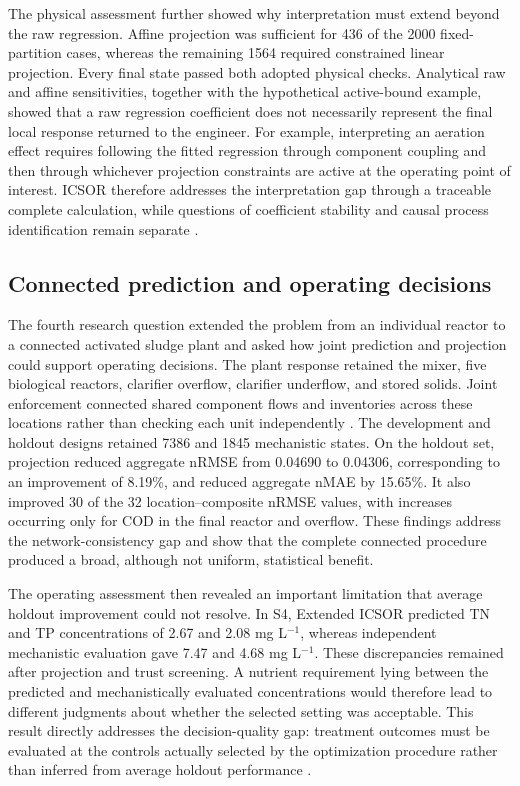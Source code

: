 The physical assessment further showed why interpretation must extend beyond the raw regression. Affine projection was sufficient for 436 of the 2000 fixed-partition cases, whereas the remaining 1564 required constrained linear projection. Every final state passed both adopted physical checks. Analytical raw and affine sensitivities, together with the hypothetical active-bound example, showed that a raw regression coefficient does not necessarily represent the final local response returned to the engineer. For example, interpreting an aeration effect requires following the fitted regression through component coupling and then through whichever projection constraints are active at the operating point of interest. ICSOR therefore addresses the interpretation gap through a traceable complete calculation, while questions of coefficient stability and causal process identification remain separate \citep{Selerio2026,Shen2023}.

\subsection{Connected prediction and operating decisions}

The fourth research question extended the problem from an individual reactor to a connected activated sludge plant and asked how joint prediction and projection could support operating decisions. The plant response retained the mixer, five biological reactors, clarifier overflow, clarifier underflow, and stored solids. Joint enforcement connected shared component flows and inventories across these locations rather than checking each unit independently \citep{Alex2008,JeppssonDiehl1996}. The development and holdout designs retained 7386 and 1845 mechanistic states. On the holdout set, projection reduced aggregate nRMSE from 0.04690 to 0.04306, corresponding to an improvement of 8.19\%, and reduced aggregate nMAE by 15.65\%. It also improved 30 of the 32 location--composite nRMSE values, with increases occurring only for COD in the final reactor and overflow. These findings address the network-consistency gap and show that the complete connected procedure produced a broad, although not uniform, statistical benefit.

The operating assessment then revealed an important limitation that average holdout improvement could not resolve. In S4, Extended ICSOR predicted TN and TP concentrations of 2.67 and 2.08 mg L$^{-1}$, whereas independent mechanistic evaluation gave 7.47 and 4.68 mg L$^{-1}$. These discrepancies remained after projection and trust screening. A nutrient requirement lying between the predicted and mechanistically evaluated concentrations would therefore lead to different judgments about whether the selected setting was acceptable. This result directly addresses the decision-quality gap: treatment outcomes must be evaluated at the controls actually selected by the optimization procedure rather than inferred from average holdout performance \citep{Alexandrov1998,Pedrozo2025}.

